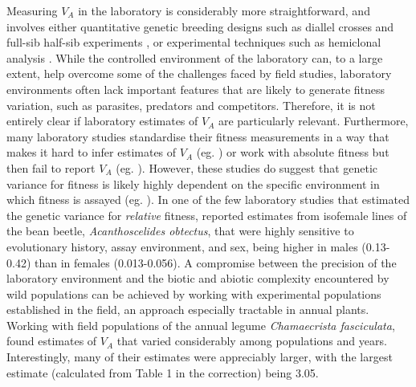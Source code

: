 \documentclass[12pt]{article}
\begin{document}
\begin{bibunit}
Measuring $V_A$ in the laboratory is considerably more straightforward, and involves either quantitative genetic breeding designs such as diallel crosses and full-sib half-sib experiments \citep{falconer1996,lynch1998}, or experimental techniques such as hemiclonal analysis \citep{abbott2011obtaining}. While the controlled environment of the laboratory can, to a large extent, help overcome some of the challenges faced by field studies, laboratory environments often lack important features that are likely to generate fitness variation, such as parasites, predators and competitors. Therefore, it is not entirely clear if laboratory estimates of $V_A$ are particularly relevant. Furthermore, many laboratory studies standardise their fitness measurements in a way that makes it hard to infer estimates of $V_A$ (eg. \citet{ruzicka2019genome})  or work with absolute fitness but then fail to report $V_A$ (eg. \citet{singh2023investigation}). However, these studies do suggest that genetic variance for fitness is likely highly dependent on the specific environment in which fitness is assayed (eg. \citet{punzalan2014comparing}). In one of the few laboratory studies that estimated the genetic variance for \emph{relative} fitness,  \citet{martinossi2018consequences} reported estimates from isofemale lines of the bean beetle, \emph{Acanthoscelides obtectus}, that were highly sensitive to evolutionary history, assay environment, and sex, being higher in males (0.13-0.42) than in females (0.013-0.056).  A compromise between the precision of the laboratory environment and the biotic and abiotic complexity encountered by wild populations can be achieved by working with experimental populations established in the field, an approach especially tractable in annual plants. Working with field populations of the annual legume \textit{Chamaecrista fasciculata}, \citet{kulbaba2019additive} found estimates of $V_A$ that varied considerably among populations and years. Interestingly, many of their estimates were appreciably larger, with the largest estimate (calculated from Table 1 in the correction) being 3.05.  


\end{bibunit}
\end{document}
